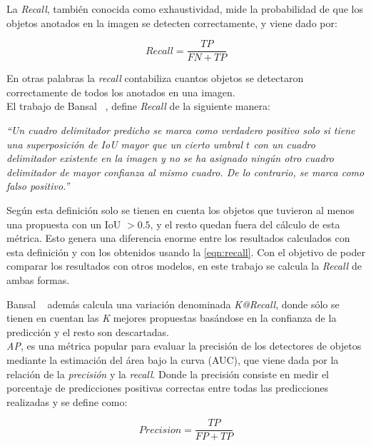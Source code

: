 La \textit{Recall}, también conocida como exhaustividad, mide la probabilidad de que los objetos anotados en la imagen se detecten correctamente, y viene dado por: 

\begin{equation}
	\label{eqn:recall}
	Recall =\frac{TP}{FN+TP}
\end{equation}

En otras palabras la \textit{recall} contabiliza cuantos objetos se detectaron correctamente de todos los anotados en una imagen.\\

El trabajo de Bansal \etal~\cite{bansal2018zero}, define \textit{Recall} de la siguiente manera: 
\begin{center}
	\textit{``Un cuadro delimitador predicho se marca como verdadero positivo solo si tiene una superposición de IoU mayor que un cierto umbral $t$ con un cuadro delimitador existente en la imagen y no se ha asignado ningún otro cuadro delimitador de mayor confianza al mismo cuadro. De lo contrario, se marca como falso positivo.''}\\
\end{center}

Según esta definición solo se tienen en cuenta los objetos que tuvieron al menos una propuesta con un IoU $> 0.5$, y el resto quedan fuera del cálculo de esta métrica. Esto genera una diferencia enorme entre los resultados calculados con esta definición y con los obtenidos usando la \autoref{eqn:recall}. Con el objetivo de poder comparar los resultados con otros modelos, en este trabajo se calcula la \textit{Recall} de ambas formas. 

Bansal \etal~\cite{bansal2018zero} además calcula una variación denominada \textit{K@Recall}, donde sólo se tienen en cuentan las \textit{K} mejores propuestas basándose en la confianza de la predicción y el resto son descartadas.\\


\textit{AP}, es una métrica popular para evaluar la precisión de los detectores de objetos mediante la estimación del área bajo la curva (AUC), que viene dada por la relación de la \textit{precisión} y la \textit{recall}. Donde la precisión consiste en medir el porcentaje de predicciones positivas correctas entre todas las predicciones realizadas y se define como:

\begin{equation} 
	\label{eqn:precision}
	Precision =\frac{TP}{FP+TP}
\end{equation}


